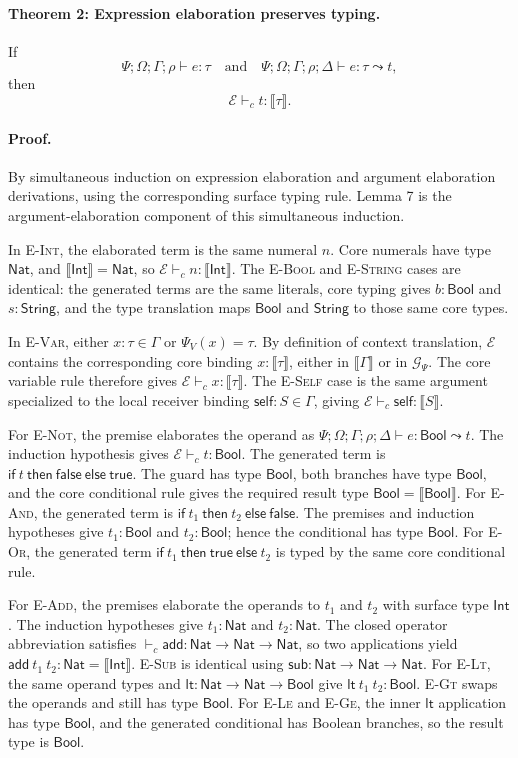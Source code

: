 \documentclass[manuscript,nonacm]{acmart}
\newcommand{\kw}[1]{\ensuremath{\mathsf{#1}}}
\newcommand{\Int}{\kw{Int}}
\newcommand{\Bool}{\kw{Bool}}
\newcommand{\String}{\kw{String}}
\newcommand{\Nat}{\kw{Nat}}
\newcommand{\ectx}{\Psi;\Omega;\Gamma;\rho;\Delta}
\newcommand{\has}{\vdash}
\newcommand{\elab}{\leadsto}
\newcommand{\trans}[1]{\llbracket #1 \rrbracket}
\begin{document}
\paragraph{Theorem 2: Expression elaboration preserves typing.}
If
\[
  \Psi;\Omega;\Gamma;\rho\has e:\tau
  \quad\text{and}\quad
  \Psi;\Omega;\Gamma;\rho;\Delta\has e:\tau\elab t,
\]
then
\[
  \mathcal{E}\has_c t:\trans{\tau}.
\]

\paragraph{Proof.}
By simultaneous induction on expression elaboration and argument elaboration derivations, using the corresponding surface typing rule.
Lemma 7 is the argument-elaboration component of this simultaneous induction.

In \textsc{E-Int}, the elaborated term is the same numeral $n$.
Core numerals have type $\Nat$, and $\trans{\Int}=\Nat$, so
$\mathcal{E}\has_c n:\trans{\Int}$.
The \textsc{E-Bool} and \textsc{E-String} cases are identical: the generated terms are the same literals, core typing gives $b:\Bool$ and $s:\String$, and the type translation maps $\Bool$ and $\String$ to those same core types.

In \textsc{E-Var}, either $x:\tau\in\Gamma$ or $\Psi_V(x)=\tau$.
By definition of context translation, $\mathcal{E}$ contains the corresponding core binding
$x:\trans{\tau}$, either in $\trans{\Gamma}$ or in $\mathcal{G}_\Psi$.
The core variable rule therefore gives
$\mathcal{E}\has_c x:\trans{\tau}$.
The \textsc{E-Self} case is the same argument specialized to the local receiver binding
$\kw{self}:S\in\Gamma$, giving
$\mathcal{E}\has_c \kw{self}:\trans{S}$.

For \textsc{E-Not}, the premise elaborates the operand as
$\ectx\has e:\Bool\elab t$.
The induction hypothesis gives $\mathcal{E}\has_c t:\Bool$.
The generated term is
$\kw{if}\ t\ \kw{then}\ \kw{false}\ \kw{else}\ \kw{true}$.
The guard has type $\Bool$, both branches have type $\Bool$, and the core conditional rule gives the required result type $\Bool=\trans{\Bool}$.
For \textsc{E-And}, the generated term is
$\kw{if}\ t_1\ \kw{then}\ t_2\ \kw{else}\ \kw{false}$.
The premises and induction hypotheses give $t_1:\Bool$ and $t_2:\Bool$; hence the conditional has type $\Bool$.
For \textsc{E-Or}, the generated term
$\kw{if}\ t_1\ \kw{then}\ \kw{true}\ \kw{else}\ t_2$
is typed by the same core conditional rule.

For \textsc{E-Add}, the premises elaborate the operands to $t_1$ and $t_2$ with surface type $\Int$.
The induction hypotheses give $t_1:\Nat$ and $t_2:\Nat$.
The closed operator abbreviation satisfies
$\has_c\mathsf{add}:\Nat\to\Nat\to\Nat$, so two applications yield
$\mathsf{add}\ t_1\ t_2:\Nat=\trans{\Int}$.
\textsc{E-Sub} is identical using
$\mathsf{sub}:\Nat\to\Nat\to\Nat$.
For \textsc{E-Lt}, the same operand types and
$\mathsf{lt}:\Nat\to\Nat\to\Bool$ give
$\mathsf{lt}\ t_1\ t_2:\Bool$.
\textsc{E-Gt} swaps the operands and still has type $\Bool$.
For \textsc{E-Le} and \textsc{E-Ge}, the inner $\mathsf{lt}$ application has type $\Bool$, and the generated conditional has Boolean branches, so the result type is $\Bool$.
\end{document}
